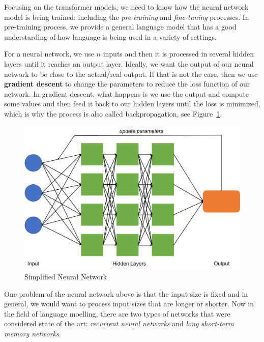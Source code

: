\documentclass[
  letterpaper,
  DIV=11,
  numbers=noendperiod]{scrartcl}
\begin{document}
Focusing on the transformer models, we need to know how the neural
network model is being trained: including the \emph{pre-training} and
\emph{fine-tuning} processes. In pre-training process, we provide a
general language model that has a good understarding of how language is
being used in a variety of settings.

For a neural network, we use \(n\) inputs and then it is processed in
several hidden layers until it reaches an output layer. Ideally, we want
the output of our neural network to be close to the actual/real output.
If that is not the case, then we use \textbf{gradient descent} to change
the parameters to reduce the loss function of our network. In gradient
descent, what happens is we use the output and compute some values and
then feed it back to our hidden layers until the loss is minimized,
which is why the process is also called backpropagation, see
Figure~\ref{fig-neural}.

\begin{figure}

{\centering \includegraphics{Figures_LLM/neural_network.png}

}

\caption{\label{fig-neural}Simplified Neural Network}

\end{figure}

One problem of the neural network above is that the input size is fixed
and in general, we would want to process input sizes that are longer or
shorter. Now in the field of language moelling, there are two types of
networks that were considered state of the art: \emph{recurrent neural
networks} and \emph{long short-term memory networks}.
\end{document}
